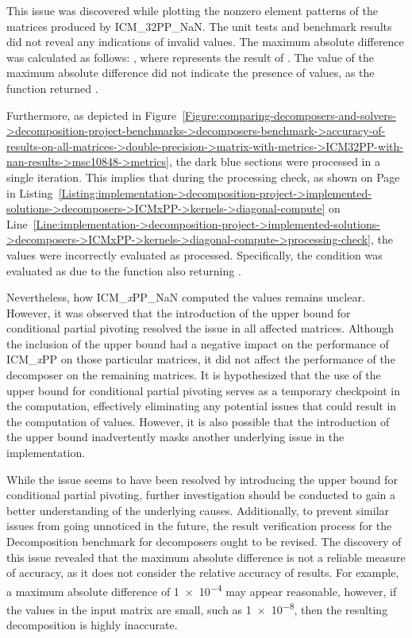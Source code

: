 This issue was discovered while plotting the nonzero element patterns of the  matrices produced by ICM\_32PP\_NaN.
The unit tests and benchmark results did not reveal any indications of invalid values.
The maximum absolute difference was calculated as follows: , where  represents the result of .
The value of the maximum absolute difference did not indicate the presence of  values, as the  function returned .

Furthermore, as depicted in Figure~\ref{Figure:comparing-decomposers-and-solvers->decomposition-project-benchmarks->decomposers-benchmark->accuracy-of-results-on-all-matrices->double-precision->matrix-with-metrics->ICM32PP-with-nan-results->msc10848->metrics}, the dark blue sections were processed in a single iteration.
This implies that during the processing check, as shown on
Page~\pageref{Listing:implementation->decomposition-project->implemented-solutions->decomposers->ICMxPP->kernels->diagonal-compute} in Listing~\ref{Listing:implementation->decomposition-project->implemented-solutions->decomposers->ICMxPP->kernels->diagonal-compute} on Line~\ref{Line:implementation->decomposition-project->implemented-solutions->decomposers->ICMxPP->kernels->diagonal-compute->processing-check}, the  values were incorrectly evaluated as processed.
Specifically, the condition  was evaluated as  due to the  function also returning .

Nevertheless, how ICM\_\textit{x}PP\_NaN computed the  values remains unclear.
However, it was observed that the introduction of the upper bound for conditional partial pivoting resolved the issue in all affected matrices.
Although the inclusion of the upper bound had a negative impact on the performance of ICM\_\textit{x}PP on those particular matrices, it did not affect the performance of the decomposer on the remaining matrices.
It is hypothesized that the use of the upper bound for conditional partial pivoting serves as a temporary checkpoint in the computation, effectively eliminating any potential issues that could result in the computation of  values.
However, it is also possible that the introduction of the upper bound inadvertently masks another underlying issue in the implementation.

While the issue seems to have been resolved by introducing the upper bound for conditional partial pivoting, further investigation should be conducted to gain a better understanding of the underlying causes.
Additionally, to prevent similar issues from going unnoticed in the future, the result verification process for the Decomposition benchmark for decomposers ought to be revised.
The discovery of this issue revealed that the maximum absolute difference is not a reliable measure of accuracy, as it does not consider the relative accuracy of results.
For example, a maximum absolute difference of \num{1e-4} may appear reasonable, however, if the values in the input matrix are small, such as \num{1e-8}, then the resulting decomposition is highly inaccurate.


